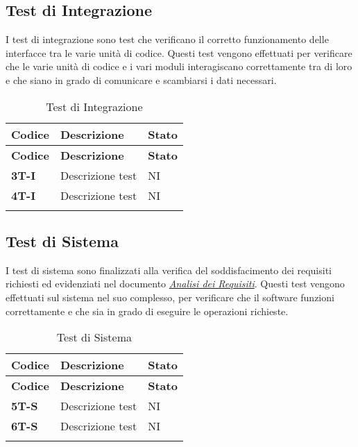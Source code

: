 \subsection{Test di Integrazione}
I test di integrazione sono test che verificano il corretto funzionamento delle interfacce tra le varie unità di codice. Questi test vengono effettuati per verificare che le varie unità di codice e i vari moduli interagiscano correttamente tra di loro e che siano in grado di comunicare e scambiarsi i dati necessari. \\
\begin{longtable}{|>{\raggedright\arraybackslash}m{}|>{\raggedright\arraybackslash}m{}|>{\raggedright\arraybackslash}m{}|}
	\hline
	\textbf{Codice} & \textbf{Descrizione} & \textbf{Stato} \\
	\hline
	\endfirsthead
	\hline
	\textbf{Codice} & \textbf{Descrizione} & \textbf{Stato} \\
	\endhead
	\textbf{3T-I}   & Descrizione test     & NI             \\
	\hline
	\textbf{4T-I}   & Descrizione test     & NI             \\
	\hline
	\caption{Test di Integrazione} %
	\label{table:13}
\end{longtable}

\subsection{Test di Sistema}
I test di sistema sono finalizzati alla verifica del soddisfacimento dei requisiti richiesti ed evidenziati nel documento \href{https://7last.github.io/docs/rtb/documentazione-esterna/analisi-dei-requisiti}{\textit{Analisi dei Requisiti}}. Questi test vengono effettuati sul sistema nel suo complesso, per verificare che il software funzioni correttamente e che sia in grado di eseguire le operazioni richieste. \\
\begin{longtable}{|>{\raggedright\arraybackslash}m{}|>{\raggedright\arraybackslash}m{}|>{\raggedright\arraybackslash}m{}|}
	\hline
	\textbf{Codice} & \textbf{Descrizione} & \textbf{Stato} \\
	\hline
	\endfirsthead
	\hline
	\textbf{Codice} & \textbf{Descrizione} & \textbf{Stato} \\
	\endhead
	\textbf{5T-S}   & Descrizione test     & NI             \\
	\hline
	\textbf{6T-S}   & Descrizione test     & NI             \\
	\hline
	\caption{Test di Sistema} %
	\label{table:14}
\end{longtable}

